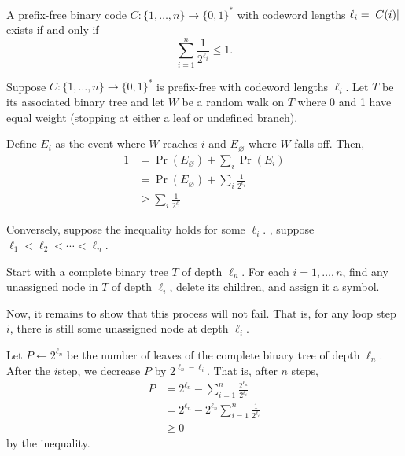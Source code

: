 \documentclass[class=co432,notes,tikz]{agony}
\begin{document}
\begin{theorem}\label{thm:kraft}
  A prefix-free binary code $C : \{1,\dotsc,n\} \to \{0,1\}^*$
  with codeword lengths $\ell_i = \abs{C(i)}$ exists if and only if
  \[ \sum_{i=1}^n \frac{1}{2^{\ell_i}} \leq 1. \]
\end{theorem}
\begin{prf}
  Suppose $C : \{1,\dotsc,n\} \to \{0,1\}^*$ is prefix-free
  with codeword lengths $\ell_i$.
  Let $T$ be its associated binary tree
  and let $W$ be a random walk on $T$ where 0 and 1 have equal weight
  (stopping at either a leaf or undefined branch).

  Define $E_i$ as the event where $W$ reaches $i$ and
  $E_\varnothing$ where $W$ falls off. Then,
  \begin{align*}
    1 & = \Pr(E_\varnothing) + \sum_i \Pr(E_i)                                   \\
      & = \Pr(E_\varnothing) + \sum_i \frac{1}{2^{\ell_i}} \tag{by independence} \\
      & \geq \sum_i \frac{1}{2^{\ell_i}} \tag{probabilities are non-negative}
  \end{align*}

  Conversely, suppose the inequality holds for some $\ell_i$.
  \WLOG, suppose $\ell_1 < \ell_2 < \dotsb < \ell_n$.

  Start with a complete binary tree $T$ of depth $\ell_n$.
  For each $i = 1,\dotsc,n$, find any unassigned node in $T$ of depth $\ell_i$,
  delete its children, and assign it a symbol.

  Now, it remains to show that this process will not fail.
  That is, for any loop step $i$, there is still some unassigned node at depth $\ell_i$.

  Let $P \gets 2^{\ell_n}$ be the number of leaves
  of the complete binary tree of depth $\ell_n$.
  After the $i$\xth step, we decrease $P$ by $2^{\ell_n - \ell_i}$.
  That is, after $n$ steps,
  \begin{align*}
    P & = 2^{\ell_n} - \sum_{i=1}^n \frac{2^{\ell_n}}{2^{\ell_i}}   \\
      & = 2^{\ell_n} - 2^{\ell_n} \sum_{i=1}^n \frac{1}{2^{\ell_i}} \\
      & \geq 0
  \end{align*}
  by the inequality.
\end{prf}
\end{document}
